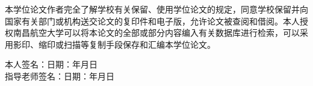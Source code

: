 本学位论文作者完全了解学校有关保留、使用学位论文的规定，同意学校保留并向国家有关部门或机构送交论文的复印件和电子版，允许论文被查阅和借阅。本人授权南昌航空大学可以将本论文的全部或部分内容编入有关数据库进行检索，可以采用影印、缩印或扫描等复制手段保存和汇编本学位论文。

\vspace*{1mm}

\begin{flushright}
  \begin{spacing}{1.65}
    本人签名：\hspace{40mm}日\hspace{2.5mm}期：\hspace{13mm}年\hspace{8mm}月\hspace{8mm}日\\
    指导老师签名：\hspace{40mm}日\hspace{2.5mm}期：\hspace{13mm}年\hspace{8mm}月\hspace{8mm}日
  \end{spacing}
\end{flushright}

\newpage
